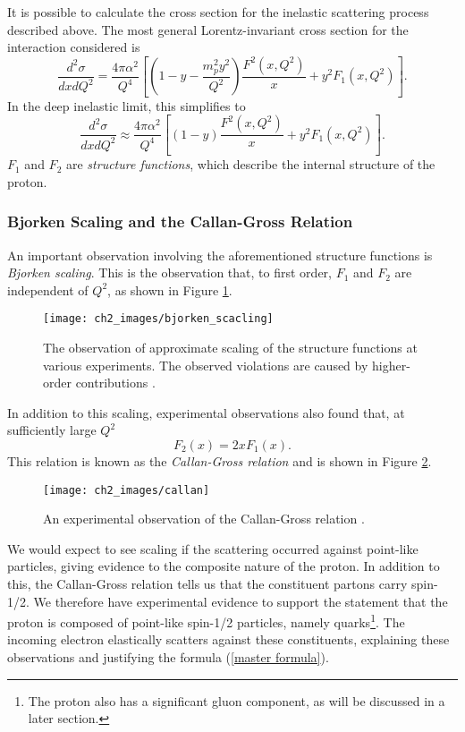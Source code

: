 \documentclass[10pt,a4paper]{book}
\begin{document}
It is possible to calculate the cross section for the inelastic scattering process described above. The most general Lorentz-invariant cross section for the interaction considered is
\begin{equation}
\frac{d^2\sigma}{dxdQ^2} = \frac{4\pi\alpha^2}{Q^4}\left[\left(1 - y - \frac{m_p^2 y^2}{Q^2} \right)\frac{F^2(x,Q^2)}{x} + y^2F_1(x,Q^2)\right].
\end{equation}
In the deep inelastic limit, this simplifies to
\begin{equation}
\frac{d^2\sigma}{dxdQ^2} \approx \frac{4\pi\alpha^2}{Q^4}\left[\left( 1 - y \right) \frac{F^2(x,Q^2)}{x} + y^2F_1(x,Q^2)\right]. 
\label{Rutherford}
\end{equation}
$F_1$ and $F_2$ are \emph{structure functions}, which describe the internal structure of the proton.

\subsubsection{Bjorken Scaling and the Callan-Gross Relation}
An important observation involving the aforementioned structure functions is \emph{Bjorken scaling}. This is the observation that, to first order, $F_1$ and $F_2$ are independent of $Q^2$, as shown in Figure \ref{Bjorken scaling}.
\begin{figure}[h!]
\centering
\texttt{[image: ch2\_images/bjorken\_scacling]}
\caption{The observation of approximate scaling of the structure functions at various experiments. The observed violations are caused by higher-order contributions \cite{pdg}.}
\label{Bjorken scaling}
\end{figure}
In addition to this scaling, experimental observations also found that, at sufficiently large $Q^2$
\begin{equation}
F_2(x) = 2xF_1(x).
\end{equation}
This relation is known as the \emph{Callan-Gross relation} and is shown in Figure \ref{Callan gross}.
\begin{figure}[h!]
\centering
\texttt{[image: ch2\_images/callan]}
\caption{An experimental observation of the Callan-Gross relation \cite{Griffiths:2008zz}.}
\label{Callan gross}
\end{figure}
We would expect to see scaling if the scattering occurred against point-like particles, giving evidence to the composite nature of the proton. In addition to this, the Callan-Gross relation tells us that the constituent partons carry spin-1/2. We therefore have experimental evidence to support the statement that the proton is composed of point-like spin-1/2 particles, namely quarks\footnote{The proton also has a significant gluon component, as will be discussed in a later section.}. The incoming electron elastically scatters against these constituents, explaining these observations and justifying the formula (\ref{master formula}).
\end{document}
